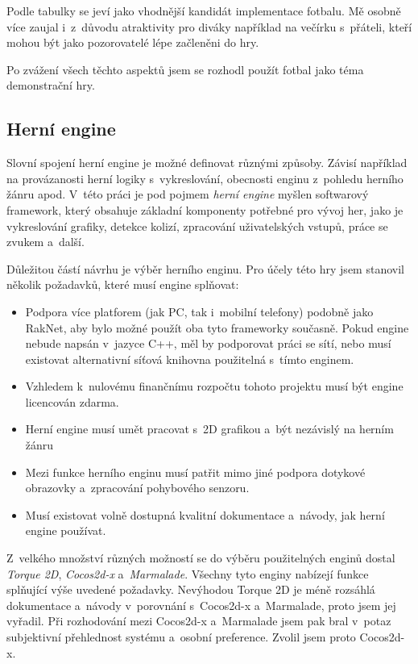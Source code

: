 \documentclass[thesis=B,czech,hidelinks]{FITthesis}[2012/06/26] %
\begin{document}
Podle tabulky se jeví jako vhodnější kandidát implementace fotbalu. Mě osobně více zaujal i~z~důvodu atraktivity pro diváky například na večírku s~přáteli, kteří mohou být jako pozorovatelé lépe začleněni do hry. 

Po zvážení všech těchto aspektů jsem se rozhodl použít fotbal jako téma demonstrační hry.

\subsection{Herní engine}

Slovní spojení herní engine je možné definovat různými způsoby. Závisí například na provázanosti herní logiky s~vykreslování, obecnosti enginu z~pohledu herního žánru apod. V~této práci je pod pojmem \textit{herní engine} myšlen softwarový framework, který obsahuje základní komponenty potřebné pro vývoj her, jako je vykreslování grafiky, detekce kolizí, zpracování uživatelských vstupů, práce se zvukem a~další. \cite{gameengine}

Důležitou částí návrhu je výběr herního enginu. Pro účely této hry jsem stanovil několik požadavků, které musí engine splňovat:

\begin{itemize}
	\item Podpora více platforem (jak PC, tak i~mobilní telefony) podobně jako RakNet, aby bylo možné použít oba tyto frameworky současně. Pokud engine nebude napsán v~jazyce C++, měl by podporovat práci se sítí, nebo musí existovat alternativní síťová knihovna použitelná s~tímto enginem.
	\item Vzhledem k~nulovému finančnímu rozpočtu tohoto projektu musí být engine licencován zdarma.
	\item Herní engine musí umět pracovat s~2D grafikou a~být nezávislý na herním žánru
	\item Mezi funkce herního enginu musí patřit mimo jiné podpora dotykové obrazovky a~zpracování pohybového senzoru.
	\item Musí existovat volně dostupná kvalitní dokumentace a~návody, jak herní engine používat.
\end{itemize}

Z~velkého množství různých možností se do výběru použitelných enginů dostal \textit{Torque 2D}, \textit{Cocos2d-x} a~\textit{Marmalade}. Všechny tyto enginy nabízejí funkce splňující výše uvedené požadavky. Nevýhodou Torque 2D je méně rozsáhlá dokumentace a~návody v~porovnání s~Cocos2d-x a~Marmalade, proto jsem jej vyřadil. Při rozhodování mezi Cocos2d-x a~Marmalade jsem pak bral v~potaz subjektivní přehlednost systému a~osobní preference. Zvolil jsem proto Cocos2d-x.
\end{document}
